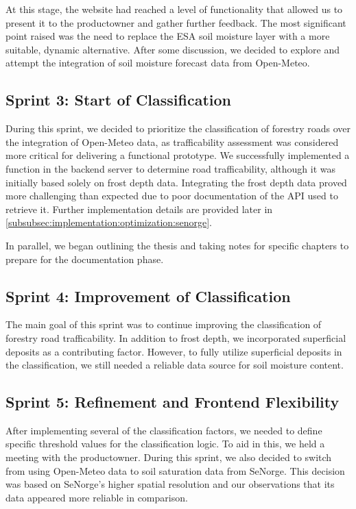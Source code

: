 At this stage, the website had reached a level of functionality that allowed us to present it to the \gls{productowner} and gather further feedback. The most significant point raised was the need to replace the ESA soil moisture layer with a more suitable, dynamic alternative. After some discussion, we decided to explore and attempt the integration of soil moisture forecast data from Open-Meteo.

\subsection*{Sprint 3: Start of Classification}

During this sprint, we decided to prioritize the classification of forestry roads over the integration of Open-Meteo data, as trafficability assessment was considered more critical for delivering a functional prototype. We successfully implemented a function in the backend server to determine road trafficability, although it was initially based solely on frost depth data. Integrating the frost depth data proved more challenging than expected due to poor documentation of the API used to retrieve it. Further implementation details are provided later in \autoref{subsubsec:implementation:optimization:senorge}.

In parallel, we began outlining the thesis and taking notes for specific chapters to prepare for the documentation phase.

\subsection*{Sprint 4: Improvement of Classification}

The main goal of this sprint was to continue improving the classification of forestry road trafficability. In addition to frost depth, we incorporated superficial deposits as a contributing factor. However, to fully utilize superficial deposits in the classification, we still needed a reliable data source for soil moisture content.

\subsection*{Sprint 5: Refinement and Frontend Flexibility}

After implementing several of the classification factors, we needed to define specific threshold values for the classification logic. To aid in this, we held a meeting with the \gls{productowner}. During this sprint, we also decided to switch from using Open-Meteo data to soil saturation data from SeNorge. This decision was based on SeNorge's higher spatial resolution and our observations that its data appeared more reliable in comparison.

